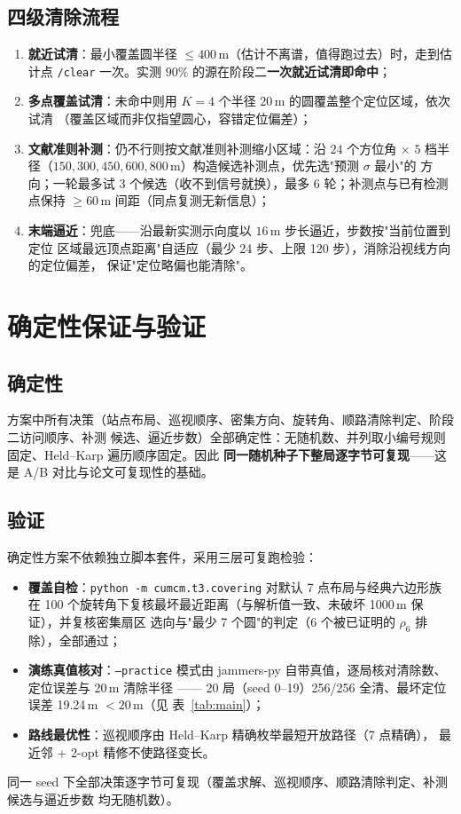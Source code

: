 \documentclass[a4paper,11pt]{ctexart}
\newcommand{\code}[1]{\texttt{#1}}
\newcommand{\tabref}[1]{表~\ref{#1}}
\begin{document}
\subsection{四级清除流程}
\begin{enumerate}
  \item \textbf{就近试清}：最小覆盖圆半径 $\le 400$\,m（估计不离谱，值得跑过去）时，走到估计点
        \code{/clear} 一次。实测 $90\%$ 的源在阶段二\textbf{一次就近试清即命中}；
  \item \textbf{多点覆盖试清}：未命中则用 $K=4$ 个半径 $20$\,m 的圆覆盖整个定位区域，依次试清
        （覆盖区域而非仅指望圆心，容错定位偏差）；
  \item \textbf{文献准则补测}：仍不行则按文献准则补测缩小区域：沿 $24$ 个方位角 $\times$
        $5$ 档半径（$150,300,450,600,800$\,m）构造候选补测点，优先选"预测 $\sigma$ 最小"的
        方向；一轮最多试 $3$ 个候选（收不到信号就换），最多 $6$ 轮；补测点与已有检测点保持
        $\ge 60$\,m 间距（同点复测无新信息）；
  \item \textbf{末端逼近}：兜底——沿最新实测示向度以 $16$\,m 步长逼近，步数按"当前位置到定位
        区域最远顶点距离"自适应（最少 24 步、上限 120 步），消除沿视线方向的定位偏差，
        保证"定位略偏也能清除"。
\end{enumerate}

\section{确定性保证与验证}
\subsection{确定性}
方案中所有决策（站点布局、巡视顺序、密集方向、旋转角、顺路清除判定、阶段二访问顺序、补测
候选、逼近步数）全部确定性：无随机数、并列取小编号规则固定、Held--Karp 遍历顺序固定。因此
\textbf{同一随机种子下整局逐字节可复现}——这是 A/B 对比与论文可复现性的基础。

\subsection{验证}
确定性方案不依赖独立脚本套件，采用三层可复跑检验：
\begin{itemize}
  \item \textbf{覆盖自检}：\code{python -m cumcm.t3.covering} 对默认 7 点布局与经典六边形族在
        100 个旋转角下复核最坏最近距离（与解析值一致、未破坏 1000\,m 保证），并复核密集扇区
        选向与"最少 7 个圆"的判定（6 个被已证明的 $\rho_6$ 排除），全部通过；
  \item \textbf{演练真值核对}：\code{--practice} 模式由 jammers-py 自带真值，逐局核对清除数、
        定位误差与 20\,m 清除半径 —— 20 局（seed 0--19）256/256 全清、最坏定位误差 19.24\,m
        $<20$\,m（见 \tabref{tab:main}）；
  \item \textbf{路线最优性}：巡视顺序由 Held--Karp 精确枚举最短开放路径（7 点精确），
        最近邻 + 2-opt 精修不使路径变长。
\end{itemize}
同一 seed 下全部决策逐字节可复现（覆盖求解、巡视顺序、顺路清除判定、补测候选与逼近步数
均无随机数）。
\end{document}
